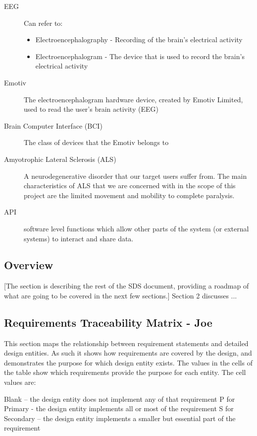 \documentclass{article}
\begin{document}
\begin{description}
    \item[EEG] Can refer to:
        \begin{itemize}
            \item Electroencephalography - Recording of the brain's electrical
                activity 
	        \item Electroencephalogram - The device that is used to record the
	            brain's electrical activity
        \end{itemize}
    \item[Emotiv] The electroencephalogram hardware device, created by Emotiv
        Limited, used to read the user's brain activity (EEG)
    \item[Brain Computer Interface (BCI)] The class of devices that the Emotiv
        belongs to
    \item[Amyotrophic Lateral Sclerosis (ALS)] A neurodegenerative disorder
        that our target users suffer from. The main characteristics of ALS
        that we are concerned with in the scope of this project are the
        limited movement and mobility to complete paralysis.
    \item[API] software level functions which allow other parts of the system (or external systems) to interact and share data.
\end{description}


\subsection{Overview}


[The section is describing the rest of the SDS document, providing a roadmap of what are going to be covered in the next few sections.]
Section 2 discusses ...

\subsection{Requirements Traceability Matrix - Joe}
This section maps the relationship between requirement statements and detailed design entities.  As such it shows how requirements are covered by the design, and demonstrates the purpose for which design entity exists.
The values in the cells of the table show which requirements provide the purpose for each entity. The cell values are:

Blank – the design entity does not implement any of that requirement
P for Primary - the design entity implements all or most of the requirement
S for Secondary – the design entity implements a smaller but essential part of the requirement
\end{document}
